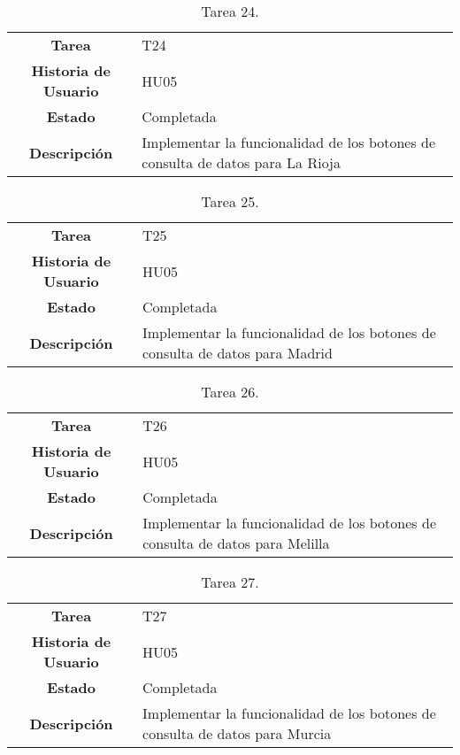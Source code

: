 \begin{table}[H]
	\begin{center}
		\begin{tabular}{| c | p{9cm} |}
			\hline
			
			\textbf{Tarea} & T24 \\
			\textbf{Historia de Usuario} & HU05 \\
			\textbf{Estado} & Completada \\
			\textbf{Descripción} & Implementar la funcionalidad de los botones de consulta de datos para La Rioja \\ \hline
		\end{tabular}
		\caption{Tarea 24.}
	\end{center}
\end{table}

\begin{table}[H]
	\begin{center}
		\begin{tabular}{| c | p{9cm} |}
			\hline
			
			\textbf{Tarea} & T25 \\
			\textbf{Historia de Usuario} & HU05 \\
			\textbf{Estado} & Completada \\
			\textbf{Descripción} & Implementar la funcionalidad de los botones de consulta de datos para Madrid \\ \hline
		\end{tabular}
		\caption{Tarea 25.}
	\end{center}
\end{table}

\begin{table}[H]
	\begin{center}
		\begin{tabular}{| c | p{9cm} |}
			\hline
			
			\textbf{Tarea} & T26 \\
			\textbf{Historia de Usuario} & HU05 \\
			\textbf{Estado} & Completada \\
			\textbf{Descripción} & Implementar la funcionalidad de los botones de consulta de datos para Melilla \\ \hline
		\end{tabular}
		\caption{Tarea 26.}
	\end{center}
\end{table}

\begin{table}[H]
	\begin{center}
		\begin{tabular}{| c | p{9cm} |}
			\hline
			
			\textbf{Tarea} & T27 \\
			\textbf{Historia de Usuario} & HU05 \\
			\textbf{Estado} & Completada \\
			\textbf{Descripción} & Implementar la funcionalidad de los botones de consulta de datos para Murcia \\ \hline
		\end{tabular}
		\caption{Tarea 27.}
	\end{center}
\end{table}

